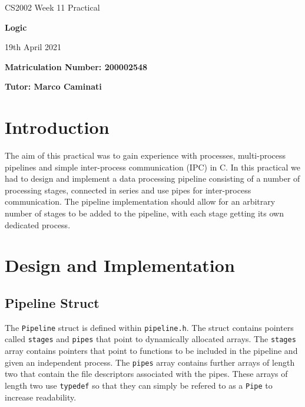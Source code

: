 \documentclass{article}
\begin{document}
    \nocite{*}

    \begin{center}
        \Huge
        CS2002 Week 11 Practical

        \vspace{0.5cm}

        \textbf{Logic}

        \vspace{1cm}
        \LARGE
        19th April 2021

        \large
        \vspace{1.5cm}

        \textbf{Matriculation Number: 200002548}

        \vspace{0.5cm}

        \textbf{Tutor: Marco Caminati}

    \end{center}

    \vspace*{3cm}

    \tableofcontents

    \newpage
    \section{Introduction}
    The aim of this practical was to gain experience with processes, multi-process pipelines and simple inter-process communication (IPC)
    in C. In this practical we had to design and implement a data processing pipeline consisting of a number of processing stages, connected in series
    and use pipes for inter-process communication.
    The pipeline implementation should allow for an arbitrary number of stages to be added to the pipeline, with each stage getting its own dedicated process.

    \section{Design and Implementation}
    \subsection{Pipeline Struct}
    The \verb+Pipeline+ struct is defined within \verb+pipeline.h+.
    The struct contains pointers called \verb+stages+ and \verb+pipes+ that point to dynamically allocated arrays.
    The \verb+stages+ array contains pointers that point to functions to be included in the pipeline and given an independent process.
    The \verb+pipes+ array contains further arrays of length two that contain the file descriptors associated with the pipes.
    These arrays of length two use \verb+typedef+ so that they can simply be refered to as a \verb+Pipe+ to increase readability.
\end{document}
